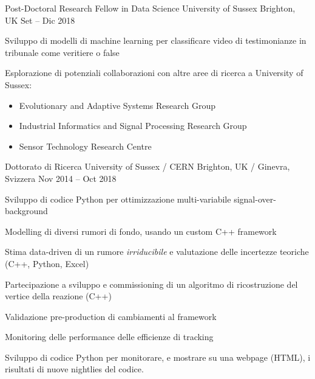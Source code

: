   \begin{cventries}
    \cventry
    {Post-Doctoral Research Fellow in Data Science}
    {University of Sussex}
    {Brighton, UK}
    {Set -- Dic 2018}
    {
      \begin{cvitems}
        \item Sviluppo di modelli di machine learning per classificare video di testimonianze in tribunale come veritiere o false
        \item Esplorazione di potenziali collaborazioni con altre aree di ricerca a University of Sussex: 
        \begin{itemize}
          \item Evolutionary and Adaptive Systems Research Group
          \item Industrial Informatics and Signal Processing Research Group
          \item Sensor Technology Research Centre
        \end{itemize}
      \end{cvitems}
    }
  \end{cventries}

  \begin{cventries}    
    \cventry
    {Dottorato di Ricerca}
    {University of Sussex / CERN}
    {Brighton, UK / Ginevra, Svizzera}
    {Nov 2014 -- Oct 2018}
    {
    \begin{cvitems}
      \item Sviluppo di codice Python per ottimizzazione multi-variabile signal-over-background 
      \item Modelling di diversi rumori di fondo, usando un custom C++ framework
      \item Stima data-driven di un rumore \emph{irriducibile} e valutazione delle incertezze teoriche (C++, Python, Excel)
      \item Partecipazione a sviluppo e commissioning di un algoritmo di ricostruzione del vertice della reazione (C++)
      \item Validazione pre-production di cambiamenti al framework
      \item Monitoring delle performance delle efficienze di tracking
      \item Sviluppo di codice Python per monitorare, e mostrare su una webpage (HTML), i risultati di nuove nightlies del codice.
    \end{cvitems}
    }
  \end{cventries}

